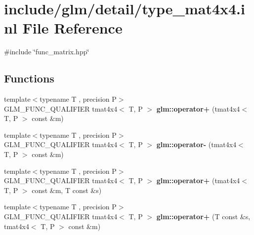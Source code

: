 \hypertarget{type__mat4x4_8inl}{}\section{include/glm/detail/type\+\_\+mat4x4.inl File Reference}
\label{type__mat4x4_8inl}
{\ttfamily \#include \char`\"{}func\+\_\+matrix.\+hpp\char`\"{}}\newline
\subsection*{Functions}
\begin{DoxyCompactItemize}
\item 
\mbox{\label{type__mat4x4_8inl_a9989e7e3651cecf45c9b7e856978fac0}} 
{\footnotesize template$<$typename T , precision P$>$ }\\G\+L\+M\+\_\+\+F\+U\+N\+C\+\_\+\+Q\+U\+A\+L\+I\+F\+I\+ER tmat4x4$<$ T, P $>$ {\bfseries glm\+::operator+} (tmat4x4$<$ T, P $>$ const \&m)
\item 
\mbox{\label{type__mat4x4_8inl_a86d70820c6583189bf78bef7a6bd6797}} 
{\footnotesize template$<$typename T , precision P$>$ }\\G\+L\+M\+\_\+\+F\+U\+N\+C\+\_\+\+Q\+U\+A\+L\+I\+F\+I\+ER tmat4x4$<$ T, P $>$ {\bfseries glm\+::operator-\/} (tmat4x4$<$ T, P $>$ const \&m)
\item 
\mbox{\label{type__mat4x4_8inl_a8d33b2d0bb5b44913406bc51d992dbb2}} 
{\footnotesize template$<$typename T , precision P$>$ }\\G\+L\+M\+\_\+\+F\+U\+N\+C\+\_\+\+Q\+U\+A\+L\+I\+F\+I\+ER tmat4x4$<$ T, P $>$ {\bfseries glm\+::operator+} (tmat4x4$<$ T, P $>$ const \&m, T const \&s)
\item 
\mbox{\label{type__mat4x4_8inl_adaf33419391a9f6e8779a0f74199013b}} 
{\footnotesize template$<$typename T , precision P$>$ }\\G\+L\+M\+\_\+\+F\+U\+N\+C\+\_\+\+Q\+U\+A\+L\+I\+F\+I\+ER tmat4x4$<$ T, P $>$ {\bfseries glm\+::operator+} (T const \&s, tmat4x4$<$ T, P $>$ const \&m)
\item 
\mbox{\label{type__mat4x4_8inl_a25f82613cbb54d1328ba0c087361f23a}} 

\end{DoxyCompactItemize}
